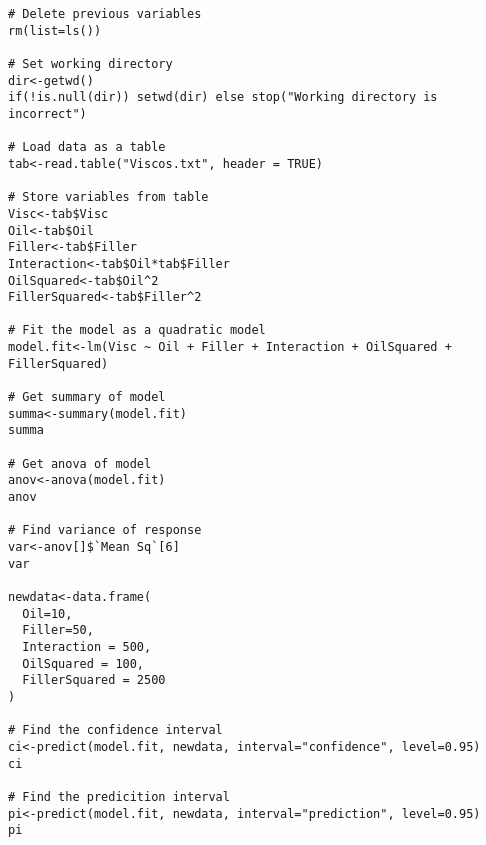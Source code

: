 \documentclass[12pt]{article}
\begin{document}
\begin{lstlisting}[caption={Quadratic regression summary method},label={R_quad_code}]
# Delete previous variables
rm(list=ls())

# Set working directory
dir<-getwd()
if(!is.null(dir)) setwd(dir) else stop("Working directory is incorrect")

# Load data as a table
tab<-read.table("Viscos.txt", header = TRUE)

# Store variables from table
Visc<-tab$Visc
Oil<-tab$Oil
Filler<-tab$Filler
Interaction<-tab$Oil*tab$Filler
OilSquared<-tab$Oil^2
FillerSquared<-tab$Filler^2

# Fit the model as a quadratic model
model.fit<-lm(Visc ~ Oil + Filler + Interaction + OilSquared + FillerSquared)

# Get summary of model
summa<-summary(model.fit)
summa

# Get anova of model
anov<-anova(model.fit)
anov

# Find variance of response
var<-anov[]$`Mean Sq`[6]
var

newdata<-data.frame(
  Oil=10,
  Filler=50,
  Interaction = 500,
  OilSquared = 100,
  FillerSquared = 2500
)

# Find the confidence interval
ci<-predict(model.fit, newdata, interval="confidence", level=0.95)
ci

# Find the predicition interval
pi<-predict(model.fit, newdata, interval="prediction", level=0.95)
pi
\end{lstlisting}
\end{document}
